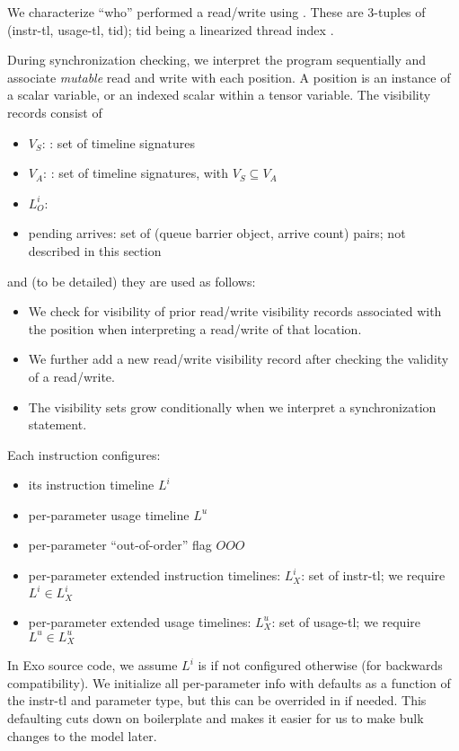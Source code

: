 \filbreak
{}

We characterize ``who'' performed a read/write  using .
These are 3-tuples of (instr-tl, usage-tl, tid); tid being a linearized thread index .

\filbreak
{}

During synchronization checking, we interpret the program sequentially and associate \textit{mutable} read and write  with each position.
A position is an instance of a scalar variable, or an indexed scalar within a tensor variable.
The visibility records consist of
\begin{itemize}
  \item $V_S$: : set of timeline signatures
  \filbreak
  \item $V_A$: : set of timeline signatures, with $V_S \subseteq V_A$
  \filbreak
  \item $L_O^i$: 
  \filbreak
  \item pending arrives: set of (queue barrier object, arrive count) pairs; not described in this section
\end{itemize}
\filbreak
and (to be detailed) they are used as follows:
\begin{itemize}
  \item We check for visibility of prior read/write visibility records associated with the position when interpreting a read/write of that location.
  \filbreak
  \item We further add a new read/write visibility record after checking the validity of a read/write.
  \filbreak
  \item The visibility sets grow conditionally when we interpret a synchronization statement.
\end{itemize}

\filbreak
{}

Each instruction configures:
\begin{itemize}
  \item its instruction timeline $L^i$
  \filbreak
  \item per-parameter usage timeline $L^u$
  \filbreak
  \item per-parameter ``out-of-order'' flag $OOO$
  \filbreak
  \item per-parameter extended instruction timelines: $L_X^i$: set of instr-tl; we require $L^i \in L_X^i$
  \filbreak
  \item per-parameter extended usage timelines: $L_X^u$: set of usage-tl; we require $L^u \in L_X^u$
\end{itemize}
\filbreak
In Exo source code, we assume $L^i$ is  if not configured otherwise (for backwards compatibility).
We initialize all per-parameter info with defaults as a function of the instr-tl and parameter  type, but this can be overrided in  if needed.
This defaulting cuts down on boilerplate and makes it easier for us to make bulk changes to the model later.

